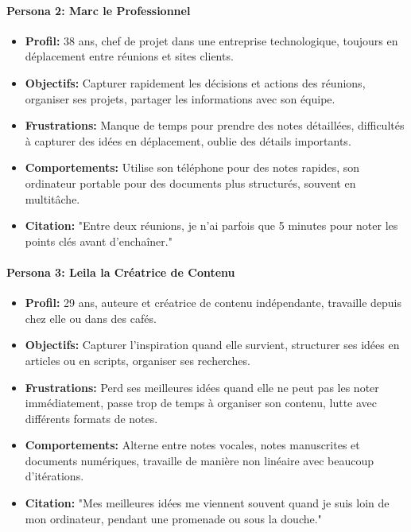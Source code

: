 \paragraph{Persona 2: Marc le Professionnel}

\begin{itemize}
    \item \textbf{Profil:} 38 ans, chef de projet dans une entreprise technologique, toujours en déplacement entre réunions et sites clients.
    \item \textbf{Objectifs:} Capturer rapidement les décisions et actions des réunions, organiser ses projets, partager les informations avec son équipe.
    \item \textbf{Frustrations:} Manque de temps pour prendre des notes détaillées, difficultés à capturer des idées en déplacement, oublie des détails importants.
    \item \textbf{Comportements:} Utilise son téléphone pour des notes rapides, son ordinateur portable pour des documents plus structurés, souvent en multitâche.
    \item \textbf{Citation:} "Entre deux réunions, je n'ai parfois que 5 minutes pour noter les points clés avant d'enchaîner."
\end{itemize}

\paragraph{Persona 3: Leila la Créatrice de Contenu}

\begin{itemize}
    \item \textbf{Profil:} 29 ans, auteure et créatrice de contenu indépendante, travaille depuis chez elle ou dans des cafés.
    \item \textbf{Objectifs:} Capturer l'inspiration quand elle survient, structurer ses idées en articles ou en scripts, organiser ses recherches.
    \item \textbf{Frustrations:} Perd ses meilleures idées quand elle ne peut pas les noter immédiatement, passe trop de temps à organiser son contenu, lutte avec différents formats de notes.
    \item \textbf{Comportements:} Alterne entre notes vocales, notes manuscrites et documents numériques, travaille de manière non linéaire avec beaucoup d'itérations.
    \item \textbf{Citation:} "Mes meilleures idées me viennent souvent quand je suis loin de mon ordinateur, pendant une promenade ou sous la douche."
\end{itemize}

